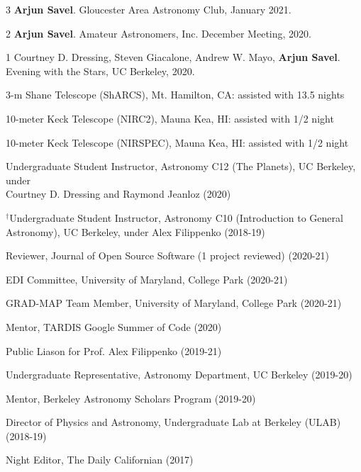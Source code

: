 \documentclass[12pt,letterpaper]{article}
\begin{document}
\begin{list}{}{\cvlist}
\item[{\color{numcolor}\scriptsize3}] \textbf{Arjun Savel}. Gloucester Area Astronomy Club, January 2021.
\item[{\color{numcolor}\scriptsize2}] \textbf{Arjun Savel}. Amateur Astronomers, Inc. December Meeting, 2020.
\item[{\color{numcolor}\scriptsize1}] Courtney D. Dressing, Steven Giacalone, Andrew W. Mayo, \textbf{Arjun Savel}. Evening with the Stars, UC Berkeley, 2020.
\end{list}



\begin{list}{}{\cvlist}

\item 3-m Shane Telescope (ShARCS), Mt. Hamilton, CA: assisted with 13.5 nights
\item 10-meter Keck Telescope (NIRC2), Mauna Kea, HI: assisted with 1/2 night
\item 10-meter Keck Telescope (NIRSPEC), Mauna Kea, HI: assisted with 1/2 night

\end{list}


\begin{list}{}{\cvlist}
\item Undergraduate Student Instructor, Astronomy C12 (The Planets), UC Berkeley, under \\ Courtney D. Dressing and Raymond Jeanloz (2020)
\item $^\dagger$Undergraduate Student Instructor, Astronomy C10 (Introduction to General \\ Astronomy), UC Berkeley, under Alex Filippenko (2018-19)
\end{list}

\begin{list}{}{\cvlist}
\item Reviewer, Journal of Open Source Software (1 project reviewed) (2020-21)
\item EDI Committee, University of Maryland, College Park (2020-21)
\item GRAD-MAP Team Member, University of Maryland, College Park (2020-21)
\item Mentor, TARDIS Google Summer of Code (2020)
\item Public Liason for Prof. Alex Filippenko (2019-21)
\item Undergraduate Representative, Astronomy Department, UC Berkeley (2019-20)
\item Mentor, Berkeley Astronomy Scholars Program (2019-20)
\item Director of Physics and Astronomy, Undergraduate Lab at Berkeley (ULAB) (2018-19)
\item Night Editor, The Daily Californian (2017)
\end{list}
\end{document}
